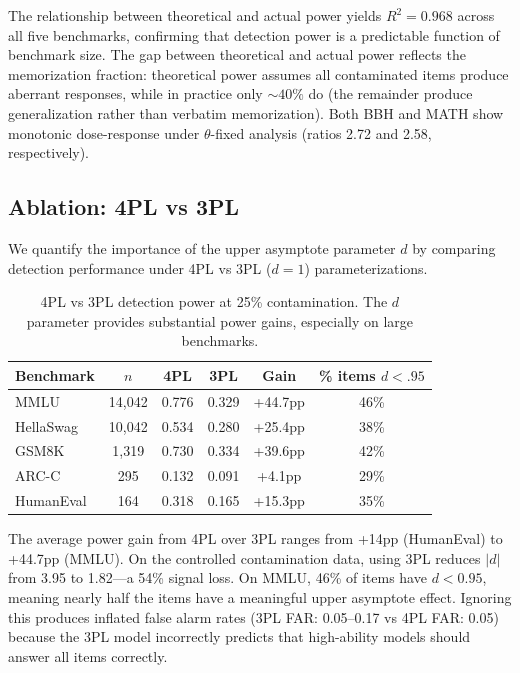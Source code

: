 \documentclass[11pt,a4paper]{article}
\newcommand{\thetafix}{$\theta$-fixed}
\begin{document}
The relationship between theoretical and actual power yields $R^2 = 0.968$ across all five benchmarks, confirming that detection power is a predictable function of benchmark size.
The gap between theoretical and actual power reflects the memorization fraction: theoretical power assumes all contaminated items produce aberrant responses, while in practice only ${\sim}40\%$ do (the remainder produce generalization rather than verbatim memorization).
Both BBH and MATH show monotonic dose-response under \thetafix{} analysis (ratios 2.72 and 2.58, respectively).

\subsection{Ablation: 4PL vs 3PL}
\label{sec:ablation}

We quantify the importance of the upper asymptote parameter $d$ by comparing detection performance under 4PL vs 3PL ($d=1$) parameterizations.

\begin{table}[h]
\centering
\small
\caption{4PL vs 3PL detection power at 25\% contamination. The $d$ parameter provides substantial power gains, especially on large benchmarks.}
\label{tab:4pl_ablation}
\begin{tabular}{lccccc}
\toprule
\textbf{Benchmark} & $n$ & \textbf{4PL} & \textbf{3PL} & \textbf{Gain} & \textbf{\% items $d<.95$} \\
\midrule
MMLU & 14,042 & 0.776 & 0.329 & +44.7pp & 46\% \\
HellaSwag & 10,042 & 0.534 & 0.280 & +25.4pp & 38\% \\
GSM8K & 1,319 & 0.730 & 0.334 & +39.6pp & 42\% \\
ARC-C & 295 & 0.132 & 0.091 & +4.1pp & 29\% \\
HumanEval & 164 & 0.318 & 0.165 & +15.3pp & 35\% \\
\bottomrule
\end{tabular}
\end{table}

The average power gain from 4PL over 3PL ranges from +14pp (HumanEval) to +44.7pp (MMLU).
On the controlled contamination data, using 3PL reduces $|d|$ from 3.95 to 1.82---a 54\% signal loss.
On MMLU, 46\% of items have $d < 0.95$, meaning nearly half the items have a meaningful upper asymptote effect.
Ignoring this produces inflated false alarm rates (3PL FAR: 0.05--0.17 vs 4PL FAR: 0.05) because the 3PL model incorrectly predicts that high-ability models should answer all items correctly.
\end{document}
